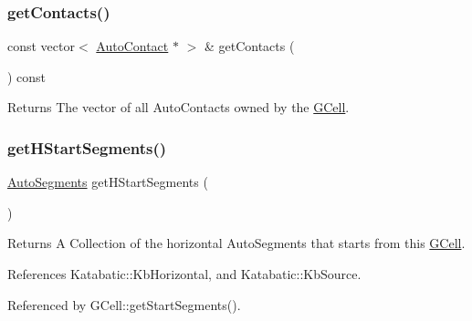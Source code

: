 \subsubsection{\texorpdfstring{get\+Contacts()}{getContacts()}}
{\footnotesize\ttfamily const vector$<$ \mbox{\hyperlink{classKatabatic_1_1AutoContact}{Auto\+Contact}} $\ast$ $>$ \& get\+Contacts (\begin{DoxyParamCaption}{ }\end{DoxyParamCaption}) const\hspace{0.3cm}{\ttfamily [inline]}}

\begin{DoxyReturn}{Returns}
The vector of all Auto\+Contacts owned by the \mbox{\hyperlink{classKatabatic_1_1GCell}{G\+Cell}}. 
\end{DoxyReturn}
\mbox{\label{classKatabatic_1_1GCell_a79668a41675e9ba0ca59d4b91e3b70be}} 
\subsubsection{\texorpdfstring{get\+H\+Start\+Segments()}{getHStartSegments()}}
{\footnotesize\ttfamily \mbox{\hyperlink{namespaceKatabatic_a2221b0ddbc24f331809fc86f98e38041}{Auto\+Segments}} get\+H\+Start\+Segments (\begin{DoxyParamCaption}{ }\end{DoxyParamCaption})}

\begin{DoxyReturn}{Returns}
A Collection of the horizontal Auto\+Segments that starts from this \mbox{\hyperlink{classKatabatic_1_1GCell}{G\+Cell}}. 
\end{DoxyReturn}


References Katabatic\+::\+Kb\+Horizontal, and Katabatic\+::\+Kb\+Source.



Referenced by G\+Cell\+::get\+Start\+Segments().

\mbox{\label{classKatabatic_1_1GCell_acbd17a4441905a4f5bc33a26bb338d0a}} 
